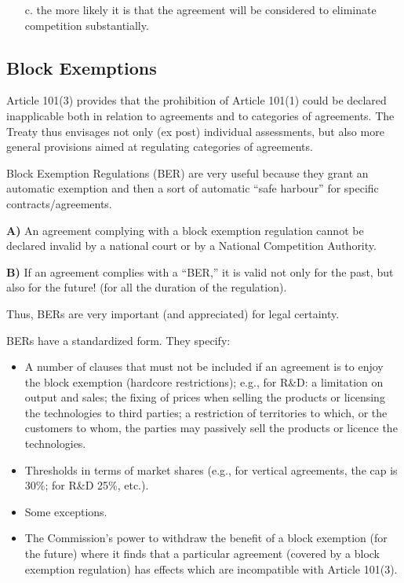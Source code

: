         \begin{itemize}
            \item[c.] the more likely it is that the agreement will be considered to eliminate competition substantially.
        \end{itemize}

\newpage
    \subsection{Block Exemptions}

        Article 101(3) provides that the prohibition of Article 101(1) could be declared inapplicable both in relation to agreements and to categories of agreements. The Treaty thus envisages not only (ex post) individual assessments, but also more general provisions aimed at regulating categories of agreements.

        Block Exemption Regulations (BER) are very useful because they grant an automatic exemption and then a sort of automatic “safe harbour” for specific contracts/agreements.
        
        \textbf{A)} An agreement complying with a block exemption regulation cannot be declared invalid by a national court or by a National Competition Authority.
        
        \textbf{B)} If an agreement complies with a “BER,” it is valid not only for the past, but also for the future! (for all the duration of the regulation). 
        
        Thus, BERs are very important (and appreciated) for legal certainty.
        
        BERs have a standardized form. They specify:
        \begin{itemize}
            \item A number of clauses that must not be included if an agreement is to enjoy the block exemption (hardcore restrictions); e.g., for R\&D: a limitation on output and sales; the fixing of prices when selling the products or licensing the technologies to third parties; a restriction of territories to which, or the customers to whom, the parties may passively sell the products or licence the technologies.
            \item Thresholds in terms of market shares (e.g., for vertical agreements, the cap is 30\%; for R\&D 25\%, etc.).
            \item Some exceptions.
            \item The Commission’s power to withdraw the benefit of a block exemption (for the future) where it finds that a particular agreement (covered by a block exemption regulation) has effects which are incompatible with Article 101(3).
        \end{itemize}
        
